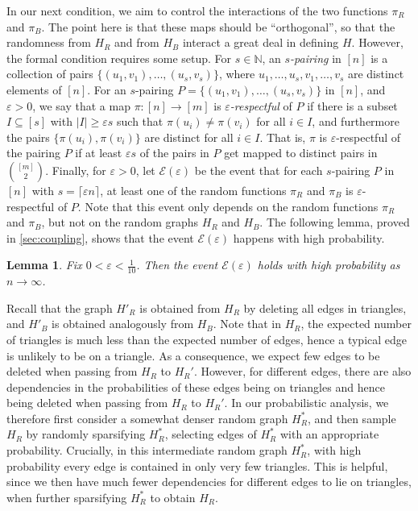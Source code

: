 \documentclass[11pt,reqno,oneside]{amsart}
\newtheorem{lemma}[theorem]{Lemma}
\theoremstyle{definition}
\newcommand\margindef[1]{\marginpar{\textcolor{gray!70!black}{\scriptsize #1}}}
\newcommand\ab[1]{\lvert#1\rvert}
\newcommand\1{\mathbf{1}}
\newcommand{\cE}{\mathcal{E}}
\newcommand{\eps}{\varepsilon}
\let\geq\geqslant
\begin{document}
In our next condition, we aim to control the interactions of the two functions $\pi_R$ and $\pi_B$. The point here is that these maps should be ``orthogonal'', so that the randomness from $H_R$ and from $H_B$ interact a great deal in defining $H$. However, the formal condition requires some setup. 
For $s\in\mathbb{N}$, an \emph{$s$-pairing}\margindef{{$s$-pairing}} in $[n]$ is a collection of pairs $\{(u_1,v_1),\dots,(u_{s},v_{s})\}$, where $u_1,\dots,u_{s},v_1,\dots,v_{s}$ are distinct elements of $[n]$. 
For an $s$-pairing $P=\{(u_1,v_1),\dots,(u_{s},v_{s})\}$ in $[n]$, and $\eps>0$, we say that a map $\pi:[n] \to [m]$ is \emph{$\varepsilon$-respectful}\margindef{{$\varepsilon$-respectful}} of $P$ if there is a subset $I \subseteq [s]$ with $\ab I \geq \varepsilon s$ such that $\pi(u_i)\neq \pi(v_i)$ for all $i \in I$, and furthermore the pairs $\{\pi(u_i),\pi(v_i)\}$ are distinct for all $ i \in I$. That is, $\pi$ is $\varepsilon$-respectful of the pairing $P$ if at least $\varepsilon s$ of the pairs in $P$ get mapped to distinct pairs in $\binom{[m]}2$. Finally, for $\eps>0$, let $\mathcal E(\varepsilon)$ be the event\margindef{{$\cE(\varepsilon)$}} that for each $s$-pairing $P$ in $[n]$ with $s= \lceil\eps n\rceil$, at least one of the random functions $\pi_R$ and $\pi_B$ is $\varepsilon$-respectful of $P$. Note that this event only depends on the random functions $\pi_R$ and $\pi_B$, but not on the random graphs $H_R$ and $H_B$. The following lemma, proved in \cref{sec:coupling}, shows that the event $\cE(\varepsilon)$ happens with high probability.

\begin{lemma}\label{lem:random coupling}
	Fix $0<\varepsilon<\frac 1{10}$. Then the event $\cE(\varepsilon)$ holds with high probability as $n \to \infty$.
\end{lemma}

Recall that the graph $H'_R$ is obtained from $H_R$ by deleting all edges in triangles, and $H'_B$ is obtained analogously from $H_B$. Note that in $H_R$, the expected number of triangles is much less than the expected number of edges, hence a typical edge is unlikely to be on a triangle. As a consequence, we expect few edges to be deleted when passing from $H_R$ to $H_R'$. However, for different edges, there are also dependencies in the probabilities of these edges being on triangles and hence being deleted when passing from $H_R$ to $H_R'$. In our probabilistic analysis, we therefore first consider a somewhat denser random graph $H^*_R$, and then sample $H_R$ by randomly sparsifying $H^*_R$, selecting edges of $H^*_R$ with an appropriate probability. Crucially, in this intermediate random graph $H^*_R$, with high probability every edge is contained in only very few triangles. This is helpful, since we then have much fewer dependencies for different edges to lie on triangles, when further sparsifying $H^*_R$ to obtain $H_R$.
\end{document}
